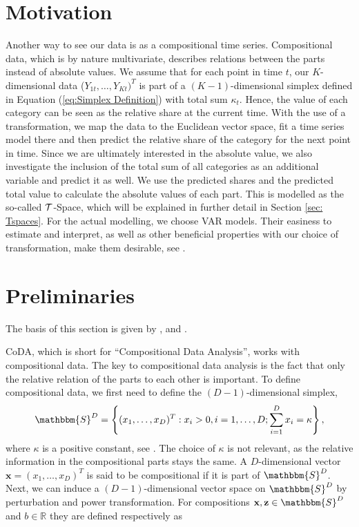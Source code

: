 \section{Motivation}
\label{sec: Coda Motivation}

Another way to see our data is as a compositional time series. Compositional data, which is by nature multivariate, describes relations between the parts instead of absolute values. We assume that for each point in time $t$, our $K$-dimensional data ($Y_{1t},\ldots,Y_{Kt})^T$ is part of a $(K-1)$-dimensional simplex defined in Equation (\ref{eq:Simplex Definition}) with total sum $\kappa_t$. Hence, the value of each category can be seen as the relative share at the current time. With the use of a transformation, we map the data to the Euclidean vector space, fit a time series model there and then predict the relative share of the category for the next point in time. Since we are ultimately interested in the absolute value, we also investigate the inclusion of the total sum of all categories as an additional variable and predict it as well. We use the predicted shares and the predicted total value to calculate the absolute values of each part. This is modelled as the so-called $\mathcal{T}$-Space, which will be explained in further detail in Section \ref{sec: Tspaces}. For the actual modelling, we choose VAR models. Their easiness to estimate and interpret, as well as other beneficial properties with our choice of transformation, make them desirable, see \textcite{Kynclova:2015}. 


\section{Preliminaries}
\label{sec: Coda Preliminaries}
The basis of this section is given by \textcite{Kynclova:2015}, \textcite{Egozcue:2003} and \textcite{Filzmoser:2020}.

CoDA, which is short for ``Compositional Data Analysis'', works with compositional data. The key to compositional data analysis is the fact that only the relative relation of the parts to each other is important. To define compositional data, we first need to define the $(D-1)$-dimensional simplex,
	\begin{equation}
	\mathbbm{S}^D = \left\{(x_1,\ldots, x_D)^T: x_i > 0, i =1,\ldots,D; \sum_{i=1}^{D}x_i=\kappa  \right\},
	\label{eq:Simplex Definition}
	\end{equation}
%
where $\kappa$ is a positive constant, see \textcite{Kynclova:2015}. The choice of $\kappa$ is not relevant, as the relative information in the compositional parts stays the same.  A $D$-dimensional vector $\textbf{x} = (x_1,\ldots,x_D)^T$ is said to be compositional if it is part of $\mathbbm{S}^D$. Next, we can induce a $(D-1)$-dimensional vector space on $\mathbbm{S}^D$ by perturbation and power transformation. For compositions $\textbf{x},\textbf{z} \in \mathbbm{S}^D$ and $b \in \mathbb{R}$ they are defined respectively as 

